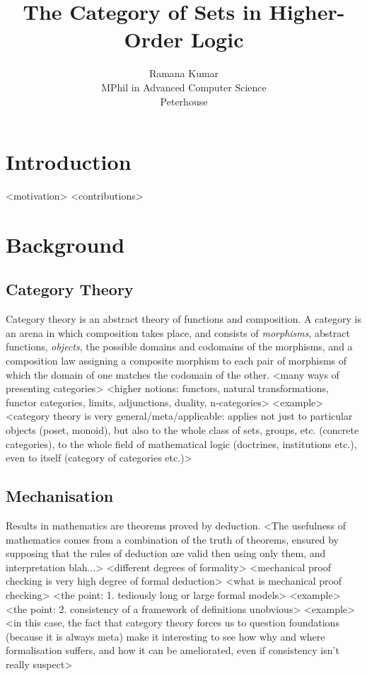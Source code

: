 \documentclass[twoside,titlepage,11pt]{article}
\title{The Category of Sets in Higher-Order Logic}
\author{Ramana Kumar\\MPhil in Advanced Computer Science\\Peterhouse}
\begin{document}
\maketitle
\section{Introduction}%
<motivation>%
<contributions>%
\section{Background}%
\subsection{Category Theory}%
Category theory is an abstract theory of functions and composition.
A category is an arena in which composition takes place, and consists of \emph{morphisms}, abstract functions, \emph{objects}, the possible domains and codomains of the morphisms, and a composition law assigning a composite morphism to each pair of morphisms of which the domain of one matches the codomain of the other.%
<many ways of presenting categories>%
<higher notions: functors, natural transformations, functor categories, limits, adjunctions, duality, n-categories>%
  <example>
<category theory is very general/meta/applicable: applies not just to particular objects (poset, monoid), but also to the whole class of sets, groups, etc. (concrete categories), to the whole field of mathematical logic (doctrines, institutions etc.), even to itself (category of categories etc.)>%
\subsection{Mechanisation}%
Results in mathematics are theorems proved by deduction.
  <The usefulness of mathematics comes from a combination of the truth of theorems, ensured by supposing that the rules of deduction are valid then using only them, and interpretation blah...>
  <different degrees of formality>
  <mechanical proof checking is very high degree of formal deduction>%
<what is mechanical proof checking>%
<the point: 1. tediously long or large formal models>%
  <example>
<the point: 2. consistency of a framework of definitions unobvious>%
  <example>
<in this case, the fact that category theory forces us to question foundations (because it is always meta) make it interesting to see how why and where formalisation suffers, and how it can be ameliorated, even if consistency isn't really suspect>%
\end{document}
